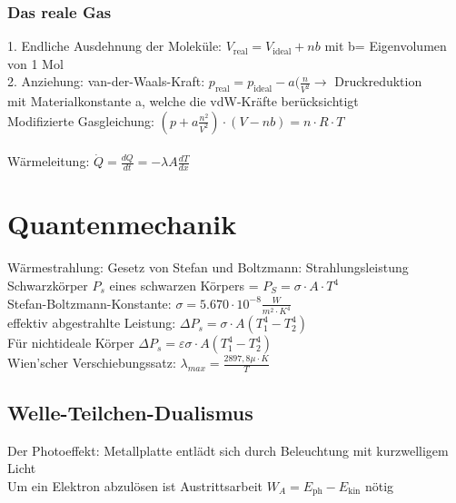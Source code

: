 \documentclass[fs, footer]{latex4ei}
\begin{document}
\begin{multicols*}{4}
\subsubsection{Das reale Gas}
1. Endliche Ausdehnung der Moleküle: $V_{\text{real}} = V_{\text{ideal}} + nb$ mit b= Eigenvolumen von 1 Mol\\
2. Anziehung: van-der-Waals-Kraft: $p_{\text{real}} = p_{\text{ideal}} - a(\frac{n}{V^2} \rightarrow$ Druckreduktion\\
mit Materialkonstante a, welche die vdW-Kräfte berücksichtigt\\

Modifizierte Gasgleichung: $(p+a\frac{n^2}{V^2})\cdot(V-nb) = n\cdot R\cdot T$\\
\\
Wärmeleitung: $\dot Q = \frac{dQ}{dt} = - \lambda  A \frac{dT}{dx}$\\



\section{Quantenmechanik}



Wärmestrahlung: Gesetz von Stefan und Boltzmann: 
Strahlungsleistung Schwarzkörper $P_s$ eines schwarzen Körpers = $ P_S = \sigma\cdot A\cdot T^4 $\\
Stefan-Boltzmann-Konstante: $\sigma = 5.670 \cdot 10^{-8}\frac{W}{m^2\cdot K^4}$\\
effektiv abgestrahlte Leistung: $\Delta P_s = \sigma\cdot A (T_1^4-T_2^4)$\\

Für nichtideale Körper $\Delta P_s = \varepsilon\sigma\cdot A (T_1^4-T_2^4)$\\
Wien'scher Verschiebungssatz: $\lambda_{max} = \frac{2897,8\mu\cdot K}{T}$\\

\subsection{Welle-Teilchen-Dualismus}
Der Photoeffekt: Metallplatte entlädt sich durch Beleuchtung mit kurzwelligem Licht\\
Um ein Elektron abzulösen ist Austrittsarbeit $W_A = E_{\text{ph}} - E_{\text{kin}}$ nötig\\


\end{multicols*}
\end{document}
